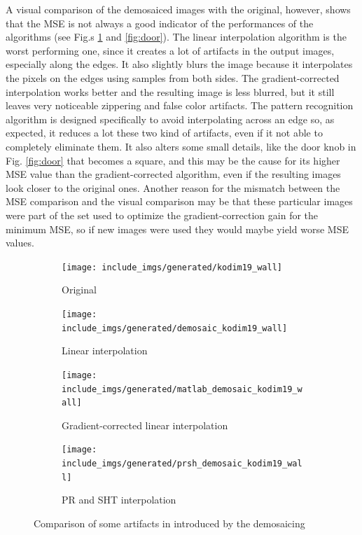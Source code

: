 \documentclass[a4paper,oneside]{article}
\begin{document}
A visual comparison of the demosaiced images with the original,
however, shows that the MSE is not always a good indicator of the
performances of the algorithms (see Fig.s \ref{fig:wall} and
\ref{fig:door}).
%
The linear interpolation algorithm is the worst performing one, since
it creates a lot of artifacts in the output images, especially along
the edges. It also slightly blurs the image because it interpolates
the pixels on the edges using samples from both sides.
%
The gradient-corrected interpolation works better and the resulting
image is less blurred, but it still leaves very noticeable zippering
and false color artifacts.
%
The pattern recognition algorithm is designed specifically to avoid
interpolating across an edge so, as expected, it reduces a lot these
two kind of artifacts, even if it not able to completely eliminate
them.
%
It also alters some small details, like the door knob in
Fig. \ref{fig:door} that becomes a square, and this may be the cause
for its higher MSE value than the gradient-corrected algorithm, even
if the resulting images look closer to the original ones.
%
Another reason for the mismatch between the MSE comparison and the
visual comparison may be that these particular images were part of the
set used to optimize the gradient-correction gain for the minimum MSE,
so if new images were used they would maybe yield worse MSE values.
\begin{figure}[htbp]
  \centering
  \begin{subfigure}{0.4\textwidth}
    \centering
    \texttt{[image: include\_imgs/generated/kodim19\_wall]}
    \caption{Original}
  \end{subfigure}%
  \begin{subfigure}{0.4\textwidth}
    \centering
    \texttt{[image: include\_imgs/generated/demosaic\_kodim19\_wall]}
    \caption{Linear interpolation}
  \end{subfigure}
  \begin{subfigure}{0.4\textwidth}
    \centering
    \texttt{[image: include\_imgs/generated/matlab\_demosaic\_kodim19\_wall]}
    \caption{Gradient-corrected linear interpolation}
  \end{subfigure}%
  \begin{subfigure}{0.4\textwidth}
    \centering
    \texttt{[image: include\_imgs/generated/prsh\_demosaic\_kodim19\_wall]}
    \caption{PR and SHT interpolation}
  \end{subfigure}
  \caption{Comparison of some artifacts in 
    introduced by the demosaicing}
  \label{fig:wall}
\end{figure}
\end{document}
